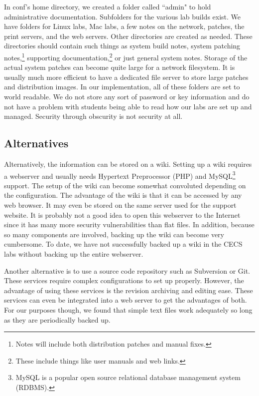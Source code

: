In conf's home directory, we created a folder called ``admin" to hold administrative documentation.  Subfolders for the various lab builds exist.  We have folders for Linux labs, Mac labs, a few notes on the network, patches, the print servers, and the web servers.  Other directories are created as needed.  These directories should contain such things as system build notes, system patching notes,\footnote{Notes will include both distribution patches and manual fixes.} supporting documentation,\footnote{These include things like user manuals and web links.} or just general system notes.  Storage of the actual system patches can become quite large for a network filesystem.  It is usually much more efficient to have a dedicated file server to store large patches and distribution images.  In our implementation, all of these folders are set to world readable.  We do not store any sort of password or key information and do not have a problem with students being able to read how our labs are set up and managed.  Security through obscurity is not security at all.  

\subsection{Alternatives}

Alternatively, the information can be stored on a wiki.  Setting up a wiki requires a webserver and usually needs Hypertext Preprocessor (PHP) and MySQL\footnote{MySQL is a popular open source relational database management system (RDBMS).} support.  The setup of the wiki can become somewhat convoluted depending on the configuration.  The advantage of the wiki is that it can be accessed by any web browser.  It may even be stored on the same server used for the support website.  It is probably not a good idea to open this webserver to the Internet since it has many more security vulnerabilities than flat files.  In addition, because so many components are involved, backing up the wiki can become very cumbersome.  To date, we have not successfully backed up a wiki in the CECS labs without backing up the entire webserver.  

Another alternative is to use a source code repository such as Subversion or Git.  These services require complex configurations to set up properly.  However, the advantage of using these services is the revision archiving and editing ease.  These services can even be integrated into a web server to get the advantages of both.  For our purposes though, we found that simple text files work adequately so long as they are periodically backed up.  
